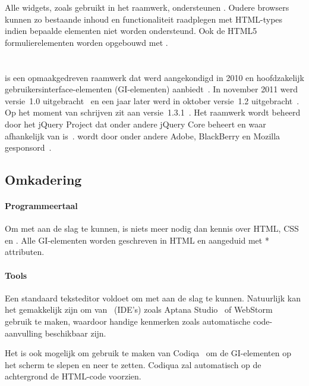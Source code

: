 Alle widgets, zoals gebruikt in het raamwerk, ondersteunen .
Oudere browsers kunnen zo bestaande inhoud en functionaliteit raadplegen met  HTML-types indien bepaalde elementen niet worden ondersteund.
Ook de HTML5 formulierelementen worden opgebouwd met .


\section{\jqm}
\label{sec:raamwerk-jqm}
\jqm{} is een opmaakgedreven raamwerk dat werd aangekondigd in 2010 en hoofdzakelijk gebruikersinterface-elementen (GI-elementen) aanbiedt~\cite{Resig2010}.
In november 2011 werd versie~1.0 uitgebracht~\cite{Parker2011} en een jaar later werd in oktober versie~1.2 uitgebracht~\cite{Parker2012}. 
Op het moment van schrijven zit \jqm{} aan versie~1.3.1~\cite{Parker2013b}. 
Het raamwerk wordt beheerd door het jQuery Project dat onder andere jQuery Core beheert en waar \jqm{} afhankelijk van is~\cite{JQuery2012}. 
\jqm{} wordt door onder andere Adobe, BlackBerry en Mozilla gesponsord~\cite{JQuery2012a}.

\subsection{Omkadering}
\paragraph{Programmeertaal}
Om met \jqm{} aan de slag te kunnen, is niets meer nodig dan kennis over HTML, CSS en \js{}. 
Alle GI-elementen worden geschreven in HTML en aangeduid met * attributen.

\paragraph{Tools}
Een standaard teksteditor voldoet om met \jqm{} aan de slag te kunnen. 
Natuurlijk kan het gemakkelijk zijn om van ~(IDE's) zoals Aptana Studio~\cite{Aptana2012} of WebStorm~\cite{JetBrains2012} gebruik te maken, waardoor handige kenmerken zoals automatische code-aanvulling beschikbaar zijn.

Het is ook mogelijk om gebruik te maken van Codiqa~\cite{Sperry2012} om de GI-elementen op het scherm te slepen en neer te zetten. 
Codiqua zal automatisch op de achtergrond de HTML-code voorzien.

